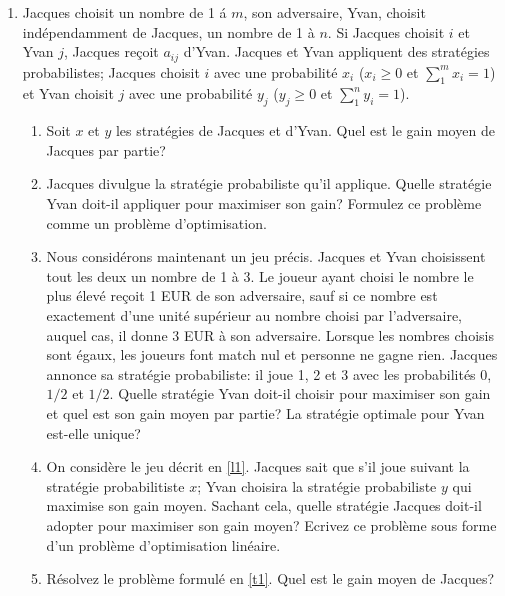\begin{enumerate}
    \begin{solution}
      \nosolution
    \end{solution}

  \item Jacques choisit un nombre de 1 \'a $m$, son adversaire, Yvan,
    choisit ind\'ependamment de Jacques, un nombre de 1 \`a $n$. Si
    Jacques choisit $i$ et Yvan $j$, Jacques re\c coit $a_{ij}$ d'Yvan.
    Jacques et Yvan appliquent des strat\'egies probabilistes; Jacques
    choisit $i$ avec une probabilit\'e $x_i$  ($x_i \geq 0$ et $\sum_1^m
    x_i =1$) et Yvan choisit $j$ avec une probabilit\'e $y_j$ ($y_j \geq
    0$ et $\sum_1^n y_i =1$).

    \begin{enumerate}
      \item Soit $x$ et $y$ les strat\'egies de Jacques et d'Yvan. Quel
      est le gain moyen de Jacques par partie? \item Jacques divulgue la
        strat\'egie probabiliste qu'il applique. Quelle strat\'egie Yvan
        doit-il appliquer pour maximiser son gain? Formulez ce probl\`eme
      comme un probl\`eme d'optimisation. \item \label{l1} Nous
        consid\'erons maintenant un jeu pr\'ecis. Jacques et Yvan
        choisissent tout les deux un nombre de  1 \`a 3. Le joueur ayant
        choisi le nombre le plus \'elev\'e re\c coit 1 EUR de son
        adversaire, sauf si ce nombre est exactement d'une unit\'e
        sup\'erieur au nombre choisi par l'adversaire, auquel cas, il donne
        3 EUR \`a son adversaire. Lorsque les nombres choisis sont \'egaux,
        les joueurs font match nul et personne ne gagne rien. Jacques
        annonce sa strat\'egie probabiliste: il joue 1, 2 et 3 avec les
        probabilit\'es $0$, $1/2$ et $1/2$. Quelle strat\'egie Yvan doit-il
        choisir pour maximiser son gain et quel est son gain moyen par
      partie? La strat\'egie optimale pour Yvan est-elle unique? \item
        \label{t1} On consid\`ere le jeu d\'ecrit en \ref{l1}. Jacques sait
        que s'il joue suivant la strat\'egie probabilitiste $x$; Yvan
        choisira la strat\'egie probabiliste $y$ qui maximise son gain
        moyen. Sachant cela, quelle strat\'egie Jacques doit-il adopter pour
        maximiser son gain moyen? Ecrivez ce probl\`eme sous forme d'un
        probl\`eme d'optimisation lin\'eaire.

      \item R\'esolvez le probl\`eme formul\'e en
        \ref{t1}. Quel est le gain moyen de Jacques?


\end{enumerate}
\end{enumerate}
